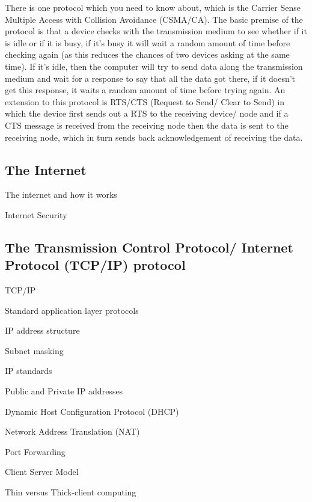   There is one protocol which you need to know about, which is the Carrier Sense Multiple Access with Collision Avoidance (CSMA/CA). The basic premise of the protocol is that a device checks with the transmission medium to see whether if it is idle or if it is busy, if it's busy it will wait a random amount of time before checking again (as this reduces the chances of two devices asking at the same time). If it's idle, then the computer will try to send data along the transmission medium and wait for a response to say that all the data got there, if it doesn't get this response, it waits a random amount of time before trying again. An extension to this protocol is RTS/CTS (Request to Send/ Clear to Send) in which the device first sends out a RTS to the receiving device/ node and if a CTS message is received from the receiving node then the data is sent to the receiving node, which in turn sends back acknowledgement of receiving the data.

\subsection{The Internet}
  \noindent
  The internet and how it works
  
  \noindent
  Internet Security
  
\subsection{The Transmission Control Protocol/ Internet Protocol (TCP/IP) protocol}
  \noindent
  TCP/IP
  
  \noindent
  Standard application layer protocols
  
  \noindent
  IP address structure
  
  \noindent
  Subnet masking
  
  \noindent
  IP standards
  
  \noindent
  Public and Private IP addresses
  
  \noindent
  Dynamic Host Configuration Protocol (DHCP)
  
  \noindent
  Network Address Translation (NAT)
  
  \noindent
  Port Forwarding
  
  \noindent
  Client Server Model
  
  \noindent
  Thin versus Thick-client computing
